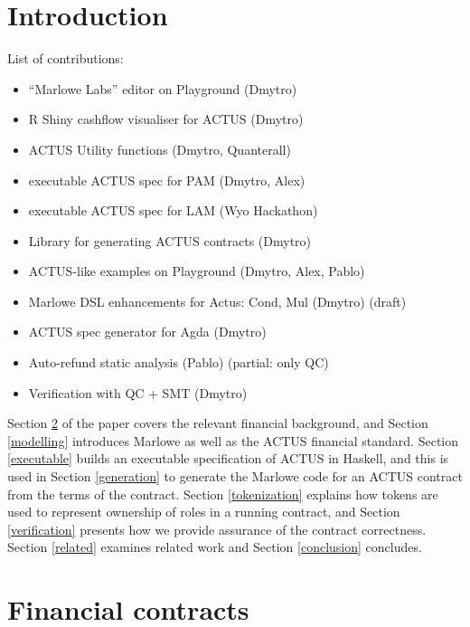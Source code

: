 \documentclass[runningheads]{llncs}
\begin{document}
\section{Introduction}



\bigskip\noindent
List of contributions:
\begin{itemize}
\item \textquotedblleft Marlowe Labs\textquotedblright{} editor on Playground
(Dmytro) 
\item R Shiny cashflow visualiser for ACTUS (Dmytro) 
\item ACTUS Utility functions (Dmytro, Quanterall) 
\item executable ACTUS spec for PAM (Dmytro, Alex) 
\item executable ACTUS spec for LAM (Wyo Hackathon) 
\item Library for generating ACTUS contracts (Dmytro) 
\item ACTUS-like examples on Playground (Dmytro, Alex, Pablo) 
\item Marlowe DSL enhancements for Actus: Cond, Mul (Dmytro) (draft) 
\item ACTUS spec generator for Agda (Dmytro) 
\item Auto-refund static analysis (Pablo) (partial: only QC) 
\item Verification with QC + SMT (Dmytro) 
\end{itemize}

Section \ref{background} of the paper covers the relevant financial background, and Section \ref{modelling} introduces Marlowe as well as the ACTUS financial standard. Section \ref{executable} builds an executable specification of ACTUS in Haskell, and this is used in Section \ref{generation} to generate  the Marlowe code for an ACTUS contract from the terms of the contract. Section \ref{tokenization} explains how tokens are used to represent ownership of roles in a running contract, and Section \ref{verification} presents how we provide assurance of the contract correctness. Section \ref{related} examines related work and Section \ref{conclusion} concludes.



\section{Financial contracts}
\label{background}
\end{document}
